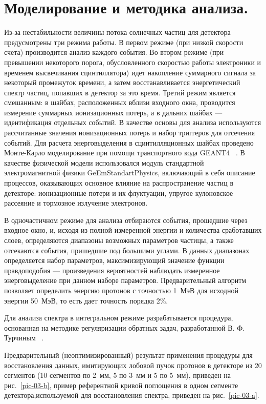 \documentclass[12pt, a4paper, notitlepage, onecolumn]{article}
\begin{document}
\section*{Моделирование и методика анализа.}
Из-за нестабильности величины потока солнечных частиц для детектора предусмотрены три режима работы. В первом режиме (при низкой скорости счета) производится анализ каждого события. Во втором режиме (при превышении некоторого порога, обусловленного скоростью работы электроники и временем высвечивания сцинтиллятора) идет накопление суммарного сигнала за некоторый промежуток времени, а затем восстанавливается энергетический спектр частиц, попавших в детектор за это время. Третий режим является смешанным: в шайбах, расположенных вблизи входного окна, проводится измерение суммарных ионизационных потерь, а в дальних шайбах --- идентификация отдельных событий. В качестве основы для анализа используются рассчитанные значения ионизационных потерь и набор триггеров для отсечения событий. Для расчета энерговыделения в сцинтилляционных шайбах проведено Монте-Карло моделирование при помощи транспортного кода GEANT4 ~\cite{ALLISON2016186}.  В качестве физической модели использовался модуль стандартной электромагнитной физики GeEmStandartPhysics, включающий в себя описание процессов, оказывающих основное влияние на распространение частиц в детекторе: ионизационные потери и их флуктуации, упругое кулоновское рассеяние и тормозное излучение электронов.

В одночастичном режиме для анализа отбираются события, прошедшие через входное окно, и, исходя из полной измеренной энергии и количества сработавших слоев, определяются диапазоны возможных параметров частицы, а также отсекаются события, пришедшие под большими углами. В данных диапазонах определяется набор параметров, максимизирующий значение функции правдоподобия --- произведения вероятностей наблюдать измеренное энерговыделение при данном наборе параметров. Предварительный алгоритм позволяет определить энергию протонов с точностью 1~МэВ для исходной энергии 50~МэВ, то есть дает точность порядка 2\%.

Для анализа спектра в интегральном режиме разрабатывается процедура, основанная на методике регуляризации обратных задач, разработанной В. Ф. Турчиным ~\cite{Turchin-epf}. 



Предварительный (неоптимизированный) результат применения процедуры для восстановления данных, имитирующих лобовой пучок протонов в детекторе из 20 сегментов (10 сегментов по 2~мм, 5 по 3~мм и 5 по 5~мм), приведен на рис.~\ref{pic-03-b}, пример референтной кривой поглощения в одном сегменте детектора,используемой для восстановления спектра, приведен на рис.~\ref{pic-03-a}. 
\end{document}
